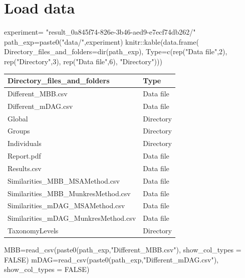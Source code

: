 \documentclass[
  letterpaper,
  DIV=11,
  numbers=noendperiod]{scrreprt}
\newenvironment{Shaded}{}{}
\newcommand{\AttributeTok}[1]{\textcolor[rgb]{0.78,0.47,0.87}{#1}}
\newcommand{\ConstantTok}[1]{\textcolor[rgb]{0.82,0.60,0.40}{#1}}
\newcommand{\DecValTok}[1]{\textcolor[rgb]{0.82,0.60,0.40}{#1}}
\newcommand{\FunctionTok}[1]{\textcolor[rgb]{0.38,0.69,0.94}{#1}}
\newcommand{\NormalTok}[1]{\textcolor[rgb]{0.67,0.70,0.75}{#1}}
\newcommand{\OtherTok}[1]{\textcolor[rgb]{0.15,0.68,0.38}{#1}}
\newcommand{\SpecialCharTok}[1]{\textcolor[rgb]{0.34,0.71,0.76}{#1}}
\newcommand{\StringTok}[1]{\textcolor[rgb]{0.60,0.76,0.47}{#1}}
\begin{document}
\hypertarget{load-data}{%
\chapter{Load data}\label{load-data}}

\begin{Shaded}
\begin{Highlighting}[]
\NormalTok{experiment}\OtherTok{=}
  \StringTok{"result\_0a845f74{-}826e{-}3b46{-}aed9{-}e7ecf74db262/"}
\NormalTok{path\_exp}\OtherTok{=}\FunctionTok{paste0}\NormalTok{(}\StringTok{"data/"}\NormalTok{,experiment)}
\NormalTok{knitr}\SpecialCharTok{::}\FunctionTok{kable}\NormalTok{(}\FunctionTok{data.frame}\NormalTok{(}
  \AttributeTok{Directory\_files\_and\_folders=}\FunctionTok{dir}\NormalTok{(path\_exp),}
  \AttributeTok{Type=}\FunctionTok{c}\NormalTok{(}\FunctionTok{rep}\NormalTok{(}\StringTok{"Data file"}\NormalTok{,}\DecValTok{2}\NormalTok{),}
         \FunctionTok{rep}\NormalTok{(}\StringTok{"Directory"}\NormalTok{,}\DecValTok{3}\NormalTok{),}
         \FunctionTok{rep}\NormalTok{(}\StringTok{"Data file"}\NormalTok{,}\DecValTok{6}\NormalTok{),}
         \StringTok{"Directory"}\NormalTok{)))}
\end{Highlighting}
\end{Shaded}

\begin{tabular}{l|l}
\hline
Directory\_files\_and\_folders & Type\\
\hline
Different\_MBB.csv & Data file\\
\hline
Different\_mDAG.csv & Data file\\
\hline
Global & Directory\\
\hline
Groups & Directory\\
\hline
Individuals & Directory\\
\hline
Report.pdf & Data file\\
\hline
Results.csv & Data file\\
\hline
Similarities\_MBB\_MSAMethod.csv & Data file\\
\hline
Similarities\_MBB\_MunkresMethod.csv & Data file\\
\hline
Similarities\_mDAG\_MSAMethod.csv & Data file\\
\hline
Similarities\_mDAG\_MunkresMethod.csv & Data file\\
\hline
TaxonomyLevels & Directory\\
\hline
\end{tabular}

\begin{Shaded}
\begin{Highlighting}[]
\NormalTok{MBB}\OtherTok{=}\FunctionTok{read\_csv}\NormalTok{(}\FunctionTok{paste0}\NormalTok{(path\_exp,}\StringTok{"Different\_MBB.csv"}\NormalTok{),}
             \AttributeTok{show\_col\_types =} \ConstantTok{FALSE}\NormalTok{)}
\NormalTok{mDAG}\OtherTok{=}\FunctionTok{read\_csv}\NormalTok{(}\FunctionTok{paste0}\NormalTok{(path\_exp,}\StringTok{"Different\_mDAG.csv"}\NormalTok{),}
              \AttributeTok{show\_col\_types =} \ConstantTok{FALSE}\NormalTok{)}
\end{Highlighting}
\end{Shaded}
\end{document}
